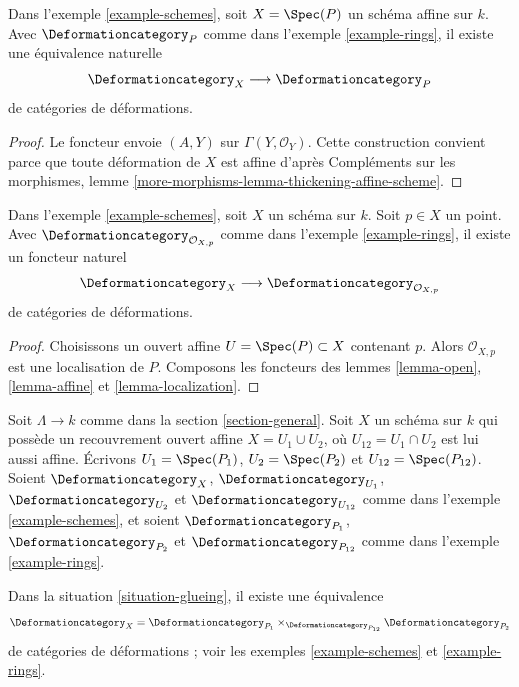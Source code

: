 \begin{lemma}
\label{lemma-affine}
Dans l'exemple \ref{example-schemes}, soit $X = \Spec(P)$ un
schéma affine sur $k$. Avec $\Deformationcategory_P$ comme dans
l'exemple \ref{example-rings}, il existe une équivalence naturelle
$$
\Deformationcategory_X \longrightarrow \Deformationcategory_P
$$
de catégories de déformations.
\end{lemma}

\begin{proof}
Le foncteur envoie $(A, Y)$ sur $\Gamma(Y, \mathcal{O}_Y)$.
Cette construction convient parce que
toute déformation de $X$ est affine d'après
Compléments sur les morphismes, lemme \ref{more-morphisms-lemma-thickening-affine-scheme}.
\end{proof}

\begin{lemma}
\label{lemma-local-ring}
Dans l'exemple \ref{example-schemes}, soit $X$ un schéma sur $k$.
Soit $p \in X$ un point. Avec $\Deformationcategory_{\mathcal{O}_{X, p}}$
comme dans l'exemple \ref{example-rings}, il existe un foncteur naturel
$$
\Deformationcategory_X
\longrightarrow
\Deformationcategory_{\mathcal{O}_{X, p}}
$$
de catégories de déformations.
\end{lemma}

\begin{proof}
Choisissons un ouvert affine $U = \Spec(P) \subset X$ contenant $p$.
Alors $\mathcal{O}_{X, p}$ est une localisation de $P$. Composons
les foncteurs des
lemmes \ref{lemma-open}, \ref{lemma-affine} et \ref{lemma-localization}.
\end{proof}

\begin{situation}
\label{situation-glueing}
Soit $\Lambda \to k$ comme dans la section \ref{section-general}.
Soit $X$ un schéma sur $k$ qui possède un recouvrement ouvert affine
$X = U_1 \cup U_2$, où $U_{12} = U_1 \cap U_2$ est lui aussi affine.
Écrivons $U_1 = \Spec(P_1)$, $U_2 = \Spec(P_2)$ et $U_{12} = \Spec(P_{12})$.
Soient $\Deformationcategory_X$, $\Deformationcategory_{U_1}$,
$\Deformationcategory_{U_2}$ et $\Deformationcategory_{U_{12}}$
comme dans l'exemple \ref{example-schemes}, et soient
$\Deformationcategory_{P_1}$, $\Deformationcategory_{P_2}$ et
$\Deformationcategory_{P_{12}}$ comme dans l'exemple \ref{example-rings}.
\end{situation}

\begin{lemma}
\label{lemma-glueing}
Dans la situation \ref{situation-glueing},
il existe une équivalence
$$
\Deformationcategory_X =
\Deformationcategory_{P_1}
\times_{\Deformationcategory_{P_{12}}}
\Deformationcategory_{P_2}
$$
de catégories de déformations ; voir les exemples \ref{example-schemes} et
\ref{example-rings}.
\end{lemma}

